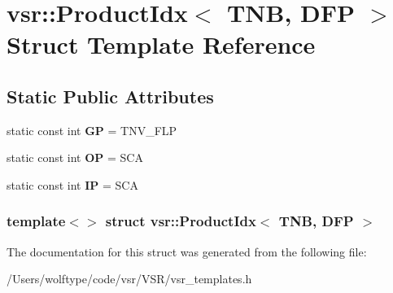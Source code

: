 \hypertarget{structvsr_1_1_product_idx_3_01_t_n_b_00_01_d_f_p_01_4}{\section{vsr\-:\-:Product\-Idx$<$ T\-N\-B, D\-F\-P $>$ Struct Template Reference}
\label{structvsr_1_1_product_idx_3_01_t_n_b_00_01_d_f_p_01_4}
}
\subsection*{Static Public Attributes}
\begin{DoxyCompactItemize}
\item 
\hypertarget{structvsr_1_1_product_idx_3_01_t_n_b_00_01_d_f_p_01_4_a01d556f73322b3d449467cc694d366eb}{static const int {\bfseries G\-P} = T\-N\-V\-\_\-\-F\-L\-P}\label{structvsr_1_1_product_idx_3_01_t_n_b_00_01_d_f_p_01_4_a01d556f73322b3d449467cc694d366eb}

\item 
\hypertarget{structvsr_1_1_product_idx_3_01_t_n_b_00_01_d_f_p_01_4_aff753e935d503db35052b10d10e1da69}{static const int {\bfseries O\-P} = S\-C\-A}\label{structvsr_1_1_product_idx_3_01_t_n_b_00_01_d_f_p_01_4_aff753e935d503db35052b10d10e1da69}

\item 
\hypertarget{structvsr_1_1_product_idx_3_01_t_n_b_00_01_d_f_p_01_4_a0347abdfe1a5089cee0eece4c8e266cd}{static const int {\bfseries I\-P} = S\-C\-A}\label{structvsr_1_1_product_idx_3_01_t_n_b_00_01_d_f_p_01_4_a0347abdfe1a5089cee0eece4c8e266cd}

\end{DoxyCompactItemize}
\subsubsection*{template$<$$>$ struct vsr\-::\-Product\-Idx$<$ T\-N\-B, D\-F\-P $>$}



The documentation for this struct was generated from the following file\-:\begin{DoxyCompactItemize}
\item 
/\-Users/wolftype/code/vsr/\-V\-S\-R/vsr\-\_\-templates.\-h\end{DoxyCompactItemize}
